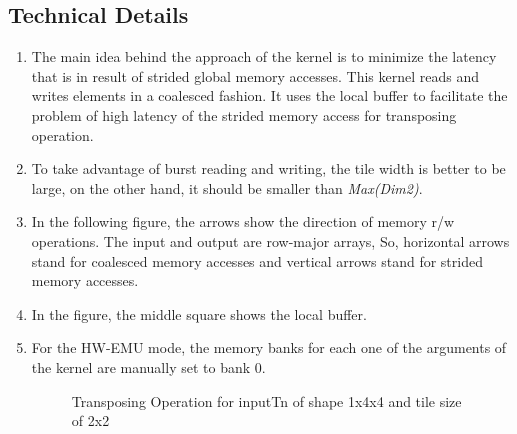 \documentclass[•]{article}
\begin{document}
\subsection{Technical Details}
\begin{enumerate}
\item The main idea behind the approach of the kernel is to minimize the latency that is in result of strided global memory accesses. This kernel reads and writes elements in a coalesced fashion. It uses the local buffer to facilitate the problem of high latency of the strided memory access for transposing operation.

\item To take advantage of burst reading and writing, the tile width is better to be large, on the other hand, it should be smaller than \emph{Max(Dim2)}.

\item In the following figure, the arrows show the direction of memory r/w operations. The input and output are row-major arrays, So, horizontal arrows stand for coalesced memory accesses and vertical arrows stand for strided memory accesses.

\item In the figure, the middle square shows the local buffer.

\item For the HW-EMU mode, the memory banks for each one of the arguments of the kernel are manually set to bank 0.

\begin{figure}[h] 
\caption{Transposing Operation for inputTn of shape 1x4x4 and tile size of 2x2}
\label{fig:transpose01}
\centering
{}
\end{figure}

\end{enumerate}
\end{document}
